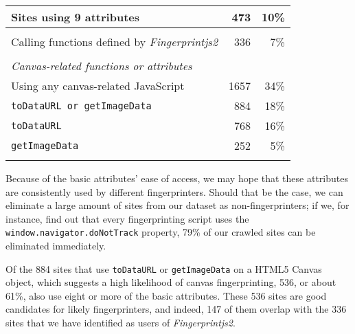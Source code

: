 \documentclass[
    fontsize=12pt,
    headings=small,
    parskip=half,
    bibliography=totoc,
    numbers=noenddot,
    open=any
]{scrreprt}
\begin{document}
\begin{center}
\begin{tabular}{l r r}
    \hline
    Sites using 9 attributes & 473 & 10\% \\
    \hline
    \\
    Calling functions defined by \textit{Fingerprintjs2} & 336 & 7\% \\ %
    \hline
    \\
    \textit{Canvas-related functions or attributes} & & \\
    \hline
    Using any canvas-related JavaScript & 1657 & 34\% \\ %
    \hline
    \texttt{toDataURL or getImageData} & 884 & 18\% \\ %
    \hline
    \texttt{toDataURL} & 768 & 16\% \\ %
    \hline
    \texttt{getImageData} & 252 & 5\% \\ %
    \hline
    \\
\end{tabular}
\end{center}

Because of the basic attributes' ease of access, we may hope that these attributes are consistently used by different fingerprinters.
Should that be the case, we can eliminate a large amount of sites from our dataset as non-fingerprinters;
if we, for instance, find out that every fingerprinting script uses the \texttt{window.navigator.doNotTrack}
property, 79\% of our crawled sites can be eliminated immediately.


Of the 884 sites that use \texttt{toDataURL} or \texttt{getImageData} on a HTML5 Canvas object, which suggests
a high likelihood of canvas fingerprinting, 536, or about 61\%, also use eight or more of the basic attributes.
These 536 sites are good candidates for likely fingerprinters, and indeed, 147 of them overlap with the 336 sites that
we have identified as users of \textit{Fingerprintjs2}.
\end{document}
